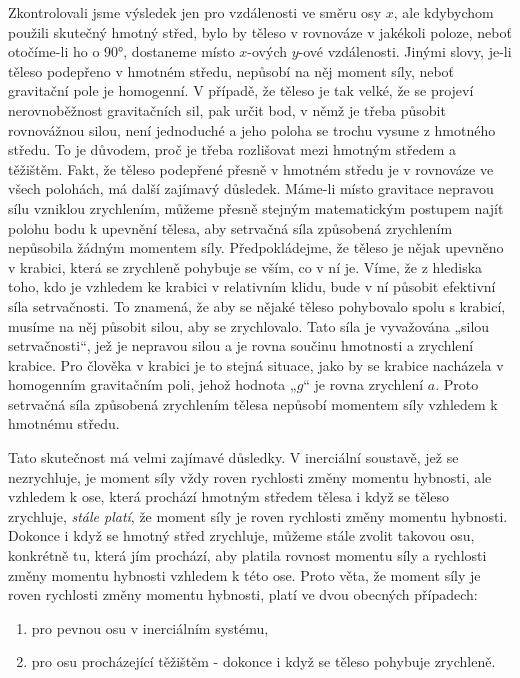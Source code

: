     Zkontrolovali jsme výsledek jen pro vzdálenosti ve směru osy \(x\), ale kdybychom použili
    skutečný hmotný střed, bylo by těleso v rovnováze v jakékoli poloze, neboť otočíme-li ho o
    \ang{90}, dostaneme místo \(x\)-ových \(y\)-ové vzdálenosti. Jinými slovy, je-li těleso
    podepřeno v hmotném středu, nepůsobí na něj moment síly, neboť gravitační pole je homogenní. V
    případě, že těleso je tak velké, že se projeví nerovnoběžnost gravitačních sil, pak určit bod, v
    němž je třeba působit rovnovážnou silou, není jednoduché a jeho poloha se trochu vysune z
    hmotného středu. To je důvodem, proč je třeba rozlišovat mezi hmotným středem a těžištěm. Fakt,
    že těleso podepřené přesně v hmotném středu je v rovnováze ve všech polohách, má další zajímavý
    důsledek. Máme-li místo gravitace nepravou sílu vzniklou zrychlením, můžeme přesně stejným
    matematickým postupem najít polohu bodu k upevnění tělesa, aby setrvačná síla způsobená
    zrychlením nepůsobila žádným momentem síly. Předpokládejme, že těleso je nějak upevněno v
    krabici, která se zrychleně pohybuje se vším, co v ní je. Víme, že z hlediska toho, kdo je
    vzhledem ke krabici v relativním klidu, bude v ní působit efektivní síla setrvačnosti. To
    znamená, že aby se nějaké těleso pohybovalo spolu s krabicí, musíme na něj působit silou, aby se
    zrychlovalo. Tato síla je vyvažována „silou setrvačnosti“, jež je nepravou silou a je rovna
    součinu hmotnosti a zrychlení krabice. Pro člověka v krabici je to stejná situace, jako by se
    krabice nacházela v homogenním gravitačním poli, jehož hodnota „\(g\)“ je rovna zrychlení \(a\).
    Proto setrvačná síla způsobená zrychlením tělesa nepůsobí momentem síly vzhledem k hmotnému
    středu.

    Tato skutečnost má velmi zajímavé důsledky. V inerciální soustavě, jež se nezrychluje, je moment
    síly vždy roven rychlosti změny momentu hybnosti, ale vzhledem k ose, která prochází hmotným
    středem tělesa i když se těleso zrychluje, \emph{stále platí}, že moment síly je roven rychlosti
    změny momentu hybnosti. Dokonce i když se hmotný střed zrychluje, můžeme stále zvolit takovou
    osu, konkrétně tu, která jím prochází, aby platila rovnost momentu síly a rychlosti změny
    momentu hybnosti vzhledem k této ose. Proto věta, že moment síly je roven rychlosti změny
    momentu hybnosti, platí ve dvou obecných případech:

    \begin{enumerate}[noitemsep]
      \item pro pevnou osu v inerciálním systému,
      \item pro osu procházející těžištěm - dokonce i když se těleso pohybuje zrychleně.      
    \end{enumerate}


